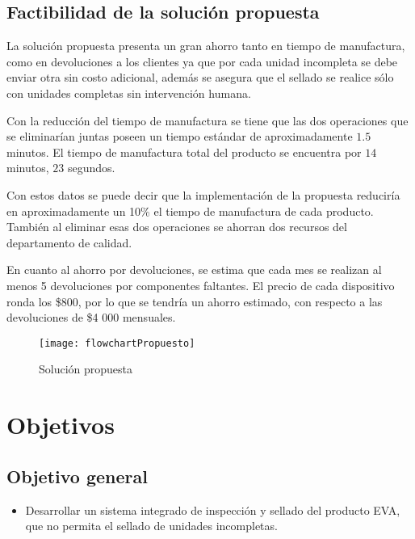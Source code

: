 \subsection{Factibilidad de la soluci\'on propuesta}

La soluci\'on propuesta presenta un gran ahorro tanto en tiempo de manufactura, como en devoluciones a los clientes ya que por cada unidad incompleta se debe enviar otra sin costo adicional, adem\'as se asegura que el sellado se realice s\'olo con unidades completas sin intervenci\'on humana. \par

Con la reducci\'on del tiempo de manufactura se tiene que las dos operaciones que se eliminar\'ian juntas poseen un tiempo est\'andar de aproximadamente $1.5$ minutos. El tiempo de manufactura total del producto se encuentra por $14$ minutos, $23$ segundos.  \par

Con estos datos se puede decir que la implementaci\'on de la propuesta reducir\'ia en aproximadamente un 10\% el tiempo de manufactura de cada producto. Tambi\'en al eliminar esas dos operaciones se ahorran dos recursos del departamento de calidad. \par

En cuanto al ahorro por devoluciones, se estima que cada mes se realizan al menos 5 devoluciones por componentes faltantes. El precio de cada dispositivo ronda los \$800, por lo que se tendr\'ia un ahorro estimado, con respecto a las devoluciones de \$4 000 mensuales.

\begin{figure}[H]
\centering
\texttt{[image: flowchartPropuesto]}
\caption{Soluci\'on propuesta}
\label{fig:solution}
\end{figure}


\newpage
\section{Objetivos}

\subsection{Objetivo general}

\begin{itemize}

\item Desarrollar un sistema integrado de inspecci\'on y sellado del producto EVA,
que no permita el sellado de unidades incompletas.


\end{itemize}

